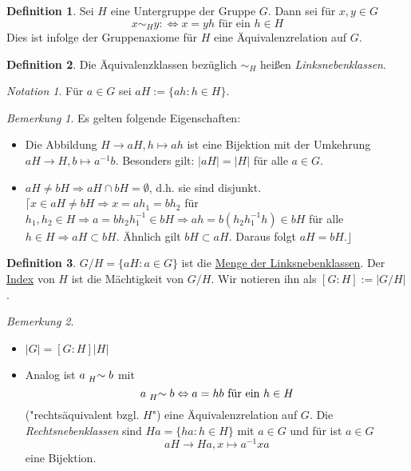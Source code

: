 \documentclass[12pt]{scrartcl} %
\theoremstyle{definition}
\newtheorem*{defn}{Definition}
\theoremstyle{remark}
\newtheorem*{notation}{Notation}
\newtheorem*{nb}{Bemerkung}
\newcommand{\defi}{\underline}
\begin{document}
\begin{defn}
	Sei $H$ eine Untergruppe der Gruppe $G$.
	Dann sei für \(x, y \in G\) \[x \sim_{H} y :\Leftrightarrow \text{\(x = yh\) für ein \(h \in H\)}\]
	Dies ist infolge der Gruppenaxiome für \(H\) eine Äquivalenzrelation auf \(G\).
\end{defn}

\begin{defn}
	Die Äquivalenzklassen bezüglich $\sim_{H}$ heißen \emph{Linksnebenklassen}.
\end{defn}

\begin{notation}
	Für $a \in G$ sei $aH := \{ah : h \in H\}$.
\end{notation}

\begin{nb}
	Es gelten folgende Eigenschaften: 
	\begin{itemize}
	\item Die Abbildung $H \to aH, h \mapsto ah$ ist eine Bijektion mit der Umkehrung $aH \to H, b \mapsto a^{-1}b$.
		Besonders gilt: $\vert aH \vert = \vert H \vert$ für alle $a \in G$.
	\item $aH \neq bH \Rightarrow aH \cap bH = \emptyset$, d.h. sie sind disjunkt. \newline $\lceil x \in aH \neq bH \Rightarrow x = ah_{1} = bh_{2}$ für $h_{1},h_{2} \in H \Rightarrow a=bh_{2}h_{1}^{-1} \in bH \Rightarrow ah= b(h_{2}h_{1}^{-1}h) \in bH$ für alle $h \in H \Rightarrow aH \subset bH$. Ähnlich gilt $bH \subset aH$.
		Daraus folgt $aH=bH.\rfloor$ %
	\end{itemize}
\end{nb}

\begin{defn}
	$G/H = \lbrace aH : a \in G \rbrace$ ist die \defi{Menge der Linksnebenklassen}.
	Der \defi{Index} von $H$ ist die Mächtigkeit von $G/H$.
	Wir notieren ihn als \([G:H] := |G/H|\).
\end{defn}

\begin{nb}
	\begin{itemize}
 	\item $\vert G \vert = [G:H]\vert H\vert$
 	\item Analog ist $a \mathrel{\prescript{}{H}{\sim}} b$ mit \[a \mathrel{\prescript{}{H}{\sim}} b \Leftrightarrow \text{\(a=hb\) für ein \(h \in H\)}\] ("rechtsäquivalent bzgl. \(H\)") eine Äquivalenzrelation auf \(G\).
		Die \emph{Rechtsnebenklassen} sind $Ha=\lbrace ha : h \in H\rbrace$ mit $a \in G$ und für ist $a \in G$ \[aH \rightarrow Ha, x \mapsto a^{-1}xa\] eine Bijektion.
	\end{itemize}
\end{nb}
\end{document}

